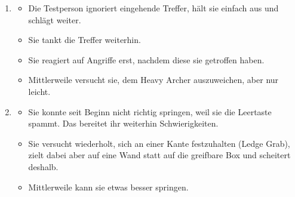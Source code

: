 \documentclass[../Main.tex]{subfiles}
\begin{document}
\begin{enumerate}[label=\textbf{B\arabic*}, leftmargin=1.5cm, itemsep=0.8em]
\item
    \begin{itemize}[nosep]
        \item Die Testperson ignoriert eingehende Treffer, hält sie einfach aus und schlägt weiter.
        \item Sie tankt die Treffer weiterhin.
        \item Sie reagiert auf Angriffe erst, nachdem diese sie getroffen haben.
        \item Mittlerweile versucht sie, dem Heavy Archer auszuweichen, aber nur leicht.
    \end{itemize}

\item
    \begin{itemize}[nosep]
        \item Sie konnte seit Beginn nicht richtig springen, weil sie die Leertaste spammt. Das bereitet ihr weiterhin Schwierigkeiten.
        \item Sie versucht wiederholt, sich an einer Kante festzuhalten (Ledge Grab), zielt dabei aber auf eine Wand statt auf die greifbare Box und scheitert deshalb.
        \item Mittlerweile kann sie etwas besser springen.
    \end{itemize}
\end{enumerate}
\end{document}
